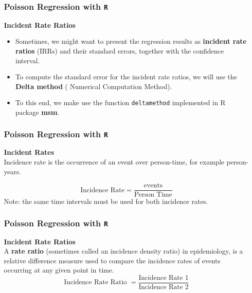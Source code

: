 \documentclass[MASTER.tex]{subfiles}
\begin{document}
\begin{frame}[fragile]
\frametitle{Poisson Regression with \texttt{R}}
\Large 
\textbf{Incident Rate Ratios}
\begin{itemize}
\item Sometimes, we might want to present the regression results as \textbf{incident rate ratios} (IRRs) and 
their standard errors, together with the confidence interval. 
\item To compute the standard error for the incident rate ratios, we will use the \textbf{Delta method} ( Numerical Computation Method). 
\item To this end, we make use the function \texttt{deltamethod} implemented in R package \textbf{msm}.
\end{itemize}
\end{frame}
\begin{frame}[fragile]
	
	\frametitle{Poisson Regression with \texttt{R}}
	\Large 
	\textbf{Incident Rates} \\
	Incidence rate is the occurrence of an event over person-time, for example person-years.
	
	\[ \mbox{Incidence Rate}  = \frac{\mbox{events}}{\mbox{Person Time}} \]
	\smallskip
	Note: the same time intervals must be used for both incidence rates.
\end{frame}
\begin{frame}[fragile]
\frametitle{Poisson Regression with \texttt{R}}
\Large 
\textbf{Incident Rate Ratios}\\
A \textbf{rate ratio} (sometimes called an incidence density ratio) in epidemiology, is a relative difference measure used to compare the incidence rates of events occurring at any given point in time. %
\smallskip
\[ \mbox{Incidence Rate Ratio }  = \frac{\mbox{Incidence Rate 1}}{\mbox{Incidence Rate 2}} \]
\end{frame}
\end{document}

